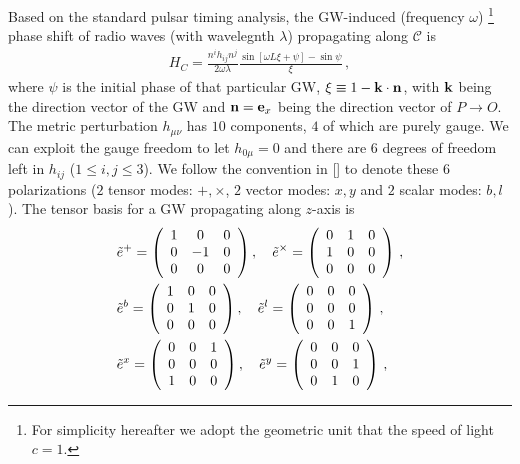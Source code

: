 \documentclass[prl,aps,floatfix,superscriptaddress,twocolumn]{revtex4}
\begin{document}
Based on the standard pulsar timing analysis, the GW-induced (frequency $\omega$) \footnote{For simplicity hereafter we adopt the geometric unit that the speed of light $c=1$.} phase shift of radio waves (with wavelegnth $\lambda$) propagating along $\mathcal{C}$  is
\begin{align}\label{eqc}
H_C = \frac{n^i h_{ij} n^j}{2\omega \lambda} \frac{\sin [\omega L \xi+\psi]-\sin \psi}{\xi}\,, 
\end{align}
where $\psi$ is the initial phase of that particular GW, $\xi \equiv 1-{\bf k}\cdot {\bf n}$, with ${\bf k}$ being the direction vector of the GW and ${\bf n}={\bf e}_x$ being the direction vector of $P\rightarrow O$. The metric perturbation $h_{\mu\nu}$ has $10$ components, $4$ of which are purely gauge. We can exploit the gauge freedom to let $h_{0\mu}=0$ and there are $6$ degrees of freedom left in $h_{ij}$ ($1 \le i,j \le 3$). We follow the convention in [] to denote these $6$ polarizations ($2$ tensor modes: $+,\times$, $2$ vector modes: $x,y$ and $2$ scalar modes: $b, l$). The tensor basis for a GW propagating along $z$-axis is
\begin{align}
&\tilde{e}^+
= 
\left (
\begin{array}{c c c}
1 & 0 & 0 \\
0 & -1 & 0 \\
0 & 0 & 0
\end{array}
\right ),\quad
\tilde{e}^\times
=\left (
\begin{array}{c c c}
0 & 1 & 0 \\
1 & 0 & 0 \\
0 & 0 & 0
\end{array}
\right )\,, \nonumber \\
&\tilde{e}^b
= 
\left (
\begin{array}{c c c}
1 & 0 & 0 \\
0 & 1 & 0 \\
0 & 0 & 0
\end{array}
\right ),\quad
\tilde{e}^l
=\left (
\begin{array}{c c c}
0 & 0 & 0 \\
0 & 0 & 0 \\
0 & 0 & 1
\end{array}
\right )\,, \nonumber \\
&\tilde{e}^x
= 
\left (
\begin{array}{c c c}
0 & 0 & 1 \\
0 & 0 & 0 \\
1 & 0 & 0
\end{array}
\right ),\quad
\tilde{e}^y
=\left (
\begin{array}{c c c}
0 & 0 & 0 \\
0 & 0 & 1 \\
0 & 1 & 0
\end{array}
\right )\,, 
\end{align}
\end{document}
